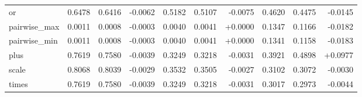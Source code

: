 \begin{table}[H]
{\begin{tabular}{l | r r r | r r r | r r r}
  or & 0.6478 & 0.6416 & -0.0062 & 0.5182 & 0.5107 & -0.0075 & 0.4620 & 0.4475 & -0.0145 \\
  pairwise\_max & 0.0011 & 0.0008 & -0.0003 & 0.0040 & 0.0041 & +0.0000 & 0.1347 & 0.1166 & -0.0182 \\
  pairwise\_min & 0.0011 & 0.0008 & -0.0003 & 0.0040 & 0.0041 & +0.0000 & 0.1341 & 0.1158 & -0.0183 \\
  plus & 0.7619 & 0.7580 & -0.0039 & 0.3249 & 0.3218 & -0.0031 & 0.3921 & 0.4898 & +0.0977 \\
  scale & 0.8068 & 0.8039 & -0.0029 & 0.3532 & 0.3505 & -0.0027 & 0.3102 & 0.3072 & -0.0030 \\
  times & 0.7619 & 0.7580 & -0.0039 & 0.3249 & 0.3218 & -0.0031 & 0.3017 & 0.2973 & -0.0044 \\
\bottomrule
\end{tabular}%
}
\end{table}
